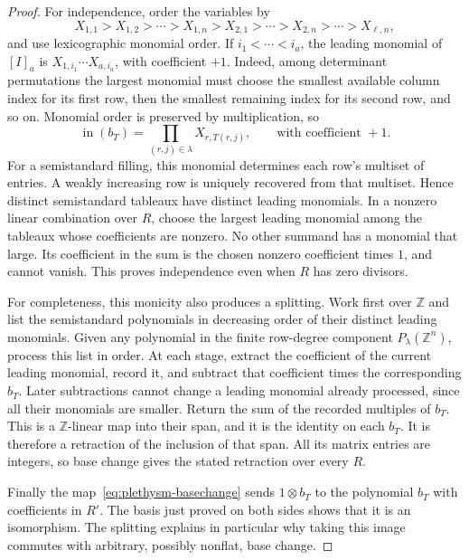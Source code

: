 \begin{proof}
For independence, order the variables by
\[
 X_{1,1}>X_{1,2}>\cdots>X_{1,n}>
 X_{2,1}>\cdots>X_{2,n}>\cdots>X_{\ell,n},
\]
and use lexicographic monomial order. If
$i_1<\cdots<i_a$, the leading monomial of $[I]_a$ is
$X_{1,i_1}\cdots X_{a,i_a}$, with coefficient $+1$.
Indeed, among determinant permutations the largest monomial must
choose the smallest available column index for its first row, then
the smallest remaining index for its second row, and so on.
Monomial order is preserved by multiplication, so
\begin{equation}
 \operatorname{in}(b_T)=
 \prod_{(r,j)\in\lambda}X_{r,T(r,j)},
 \qquad
 \text{with coefficient }+1.
 \label{eq:plethysm-leading-monomial}
\end{equation}
For a semistandard filling, this monomial determines each row's
multiset of entries. A weakly increasing row is uniquely recovered
from that multiset. Hence distinct semistandard tableaux have
distinct leading monomials. In a nonzero linear combination over
$R$, choose the largest leading monomial among the tableaux whose
coefficients are nonzero. No other summand has a monomial that
large. Its coefficient in the sum is the chosen nonzero coefficient
times $1$, and cannot vanish. This proves independence even when
$R$ has zero divisors.

For completeness, this monicity also produces a splitting. Work
first over $\mathbb Z$ and list the semistandard polynomials in
decreasing order of their distinct leading monomials. Given any
polynomial in the finite row-degree component $P_\lambda(\mathbb Z^n)$,
process this list in order. At each stage, extract the coefficient
of the current leading monomial, record it, and subtract that
coefficient times the corresponding $b_T$. Later subtractions
cannot change a leading monomial already processed, since all
their monomials are smaller. Return the sum of the recorded
multiples of $b_T$. This is a $\mathbb Z$-linear map into their
span, and it is the identity on each $b_T$. It is therefore a
retraction of the inclusion of that span. All its matrix entries
are integers, so base change gives the stated retraction over
every $R$.

Finally the map~\eqref{eq:plethysm-basechange} sends
$1\otimes b_T$ to the polynomial $b_T$ with coefficients in $R'$.
The basis just proved on both sides shows that it is an
isomorphism. The splitting explains in particular why taking this
image commutes with arbitrary, possibly nonflat, base change.
\end{proof}

